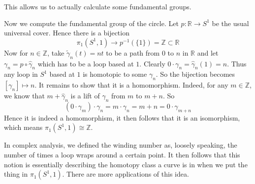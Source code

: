 This allows us to actually calculate some fundamental groups.
\begin{example}
    Now we compute the fundamental group of the circle.
    Let $p:\mathbb R\to S^1$ be the usual universal cover.
    Hence there is a bijection
    $$\pi_1(S^1,1)\to p^{-1}(\{1\})=\mathbb Z\subset\mathbb R$$
    Now for $n\in\mathbb Z$, take $\tilde{\gamma}_n(t)=nt$ to be a path from $0$ to $n$ in $\mathbb R$ and let $\gamma_n=p\circ\hat{\gamma}_n$ which has to be a loop based at $1$.
    Clearly $0\cdot\gamma_n=\hat{\gamma}_n(1)=n$.
    Thus any loop in $S^1$ based at $1$ is homotopic to some $\gamma_n$.
    So the bijection becomes $[\gamma_n]\mapsto n$.
    It remains to show that it is a homomorphism.
    Indeed, for any $m\in\mathbb Z$, we know that $m+\hat{\gamma}_n$ is a lift of $\gamma_n$ from $m$ to $m+n$.
    So
    $$(0\cdot\gamma_m)\cdot\gamma_n=m\cdot\gamma_n=m+n=0\cdot\gamma_{m+n}$$
    Hence it is indeed a homomorphism, it then follows that it is an isomorphism, which means $\pi_1(S^1,1)\cong\mathbb Z$.
\end{example}
In complex analysis, we defined the winding number as, loosely speaking, the number of times a loop wraps around a certain point.
It then follows that this notion is essentially describing the homotopy class a curve is in when we put the thing in $\pi_1(S^1,1)$.
There are more applications of this idea.
